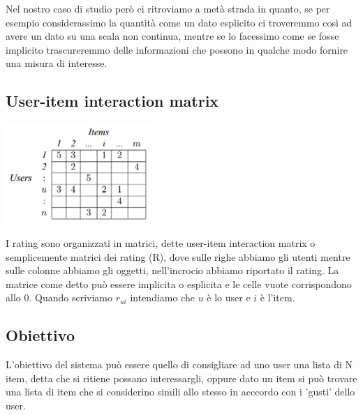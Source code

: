Nel nostro caso di studio però ci ritroviamo a metà strada in quanto, se per esempio considerassimo la quantità come un dato esplicito ci troveremmo così ad avere un dato su una scala non continua, mentre se lo facessimo come se fosse implicito trascureremmo delle informazioni che possono in qualche modo fornire una misura di interesse.

\subsection{User-item interaction matrix}
\begin{minipage}[H]{0.45\textwidth}
	\begin{center}
		\includegraphics[width=5.5cm]{figures/Sample-of-user-item-matrix}
		\label{tab:user_item_matrix}
	\end{center}
\end{minipage}
\begin{minipage}[H]{0.55\textwidth}
	I rating sono organizzati in matrici, dette user-item interaction matrix o semplicemente matrici dei rating (R), dove sulle righe abbiamo gli utenti mentre sulle colonne abbiamo gli oggetti, nell'incrocio abbiamo riportato il rating. 
	La matrice come detto può essere implicita o esplicita e le celle vuote corrispondono allo 0.
	Quando scriviamo $r_{ui}$ intendiamo che $u$ è lo user e $i$ è l'item.
\end{minipage}

\subsection{Obiettivo}
L'obiettivo del sistema può essere quello di consigliare ad uno user una lista di N item, detta  che si ritiene possano interessargli, oppure dato un item si può trovare una lista di item che si considerino simili allo stesso in acccordo con i 'gusti' dello user.


